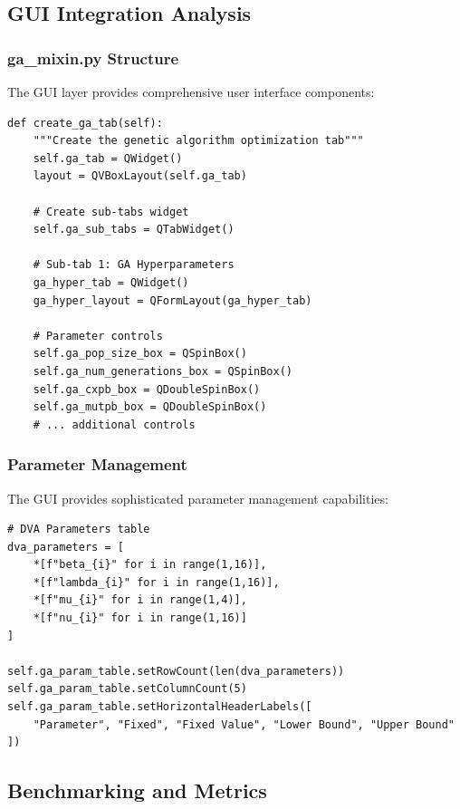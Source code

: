\documentclass[12pt,a4paper]{article}
\begin{document}
\subsection{GUI Integration Analysis}

\subsubsection{ga\_mixin.py Structure}
The GUI layer provides comprehensive user interface components:

\begin{lstlisting}[caption=GUI Tab Creation]
def create_ga_tab(self):
    """Create the genetic algorithm optimization tab"""
    self.ga_tab = QWidget()
    layout = QVBoxLayout(self.ga_tab)
    
    # Create sub-tabs widget
    self.ga_sub_tabs = QTabWidget()
    
    # Sub-tab 1: GA Hyperparameters
    ga_hyper_tab = QWidget()
    ga_hyper_layout = QFormLayout(ga_hyper_tab)
    
    # Parameter controls
    self.ga_pop_size_box = QSpinBox()
    self.ga_num_generations_box = QSpinBox()
    self.ga_cxpb_box = QDoubleSpinBox()
    self.ga_mutpb_box = QDoubleSpinBox()
    # ... additional controls
\end{lstlisting}

\subsubsection{Parameter Management}
The GUI provides sophisticated parameter management capabilities:

\begin{lstlisting}[caption=Parameter Table Implementation]
# DVA Parameters table
dva_parameters = [
    *[f"beta_{i}" for i in range(1,16)],
    *[f"lambda_{i}" for i in range(1,16)],
    *[f"mu_{i}" for i in range(1,4)],
    *[f"nu_{i}" for i in range(1,16)]
]

self.ga_param_table.setRowCount(len(dva_parameters))
self.ga_param_table.setColumnCount(5)
self.ga_param_table.setHorizontalHeaderLabels([
    "Parameter", "Fixed", "Fixed Value", "Lower Bound", "Upper Bound"
])
\end{lstlisting}

\subsection{Benchmarking and Metrics}
\end{document}

